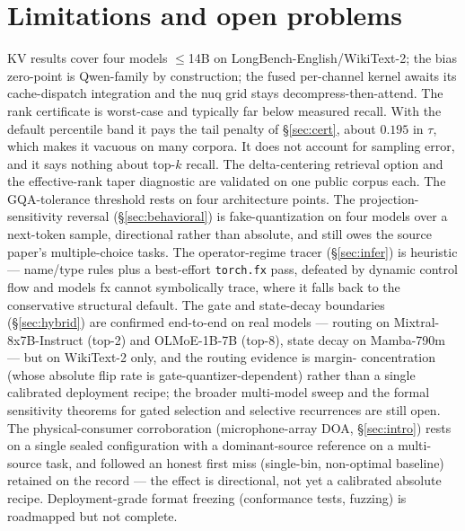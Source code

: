 \documentclass[11pt]{article}
\begin{document}
\section{Limitations and open problems}\label{sec:limits}
KV results cover four models $\leq$14B on LongBench-English/WikiText-2; the
bias zero-point is Qwen-family by construction; the fused per-channel kernel
awaits its cache-dispatch integration and the nuq grid stays
decompress-then-attend. The rank certificate is worst-case and typically far
below measured recall. With the default percentile band it pays the tail
penalty of \S\ref{sec:cert}, about $0.195$ in $\tau$, which makes it vacuous on
many corpora. It does not account for sampling error, and it says nothing about
top-$k$ recall. The delta-centering
retrieval option and the effective-rank taper diagnostic are validated on
one public corpus each. The GQA-tolerance threshold rests on four
architecture points. The projection-sensitivity reversal (\S\ref{sec:behavioral})
is fake-quantization on four models over a next-token sample, directional
rather than absolute, and still owes the source paper's multiple-choice tasks.
The operator-regime tracer (\S\ref{sec:infer}) is
heuristic --- name/type rules plus a best-effort \texttt{torch.fx} pass, defeated
by dynamic control flow and models fx cannot symbolically trace, where it falls
back to the conservative structural default. The gate and state-decay boundaries
(\S\ref{sec:hybrid}) are confirmed end-to-end on real models --- routing on
Mixtral-8x7B-Instruct (top-2) and OLMoE-1B-7B (top-8), state decay on
Mamba-790m --- but on WikiText-2 only, and the routing evidence is margin-
concentration (whose absolute flip rate is gate-quantizer-dependent) rather than
a single calibrated deployment recipe; the broader multi-model sweep and the
formal sensitivity theorems for gated selection and selective recurrences are
still open. The physical-consumer corroboration (microphone-array DOA, \S\ref{sec:intro})
rests on a single sealed configuration with a dominant-source reference on a multi-source
task, and followed an honest first miss (single-bin, non-optimal baseline) retained on the
record --- the effect is directional, not yet a calibrated absolute recipe. Deployment-grade
format freezing (conformance tests, fuzzing) is roadmapped but not complete.
\end{document}

